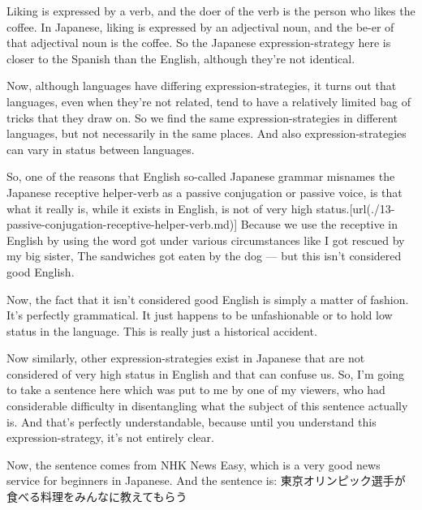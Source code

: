 Liking is expressed by a verb, and the doer of the verb is the person who likes the coffee. In Japanese, liking is expressed by an adjectival noun, and the be-er of that adjectival noun is the coffee. So the Japanese expression-strategy here is closer to the Spanish than the English, although they're not identical.

Now, although languages have differing expression-strategies, it turns out that languages, even when they're not related, tend to have a relatively limited bag of tricks that they draw on. So we find the same expression-strategies in different languages, but not necessarily in the same places. And also expression-strategies can vary in status between languages.

{}

\stopsectionlevel

\startsectionlevel[title={Receptive helper},reference={receptive-helper}]

So, one of the reasons that English so-called Japanese grammar misnames the Japanese receptive helper-verb as a passive conjugation or passive voice, is that what it really is, while it exists in English, is not of very high status.\goto{{[}13{]}}[url(./13-passive-conjugation-receptive-helper-verb.md)] Because we use the receptive in English by using the word got under various circumstances like I got rescued by my big sister, The sandwiches got eaten by the dog --- but this isn't considered good English.

Now, the fact that it isn't considered good English is simply a matter of fashion. It's perfectly grammatical. It just happens to be unfashionable or to hold low status in the language. This is really just a historical accident.

Now similarly, other expression-strategies exist in Japanese that are not considered of very high status in English and that can confuse us. So, I'm going to take a sentence here which was put to me by one of my viewers, who had considerable difficulty in disentangling what the subject of this sentence actually is. And that's perfectly understandable, because until you understand this expression-strategy, it's not entirely clear.

\stopsectionlevel

\startsectionlevel[title={Hidden subject sentence analysis},reference={hidden-subject-sentence-analysis}]

Now, the sentence comes from NHK News Easy, which is a very good news service for beginners in Japanese. And the sentence is: 東京オリンピック選手が食べる料理をみんなに教えてもらう

